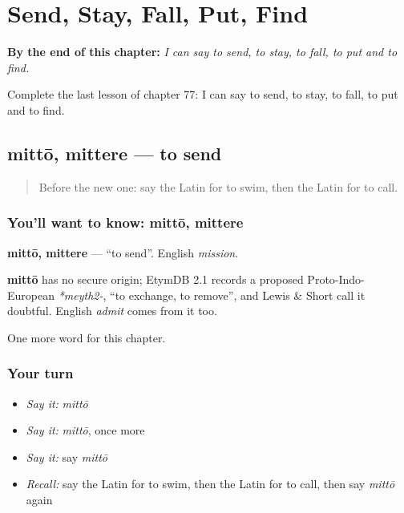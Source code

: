 
\chapter{Send, Stay, Fall, Put, Find}
\label{ch:la-send-stay-fall-put-find}

\begin{chapteropening}
\textbf{By the end of this chapter:} \emph{I can say to send, to stay, to fall, to put and to find.}

Complete the last lesson of chapter 77: I can say to send, to stay, to fall, to put and to find.
\end{chapteropening}

\section[mittō, mittere]{mittō, mittere — to send}

\label{lesson:LA-C77-mitto}



\begin{quote}
Before the new one: say the Latin for to swim, then the Latin for to call.
\end{quote}

\subsection*{You'll want to know: mittō, mittere}
\textbf{mittō, mittere} — \textquotedblleft{}to send\textquotedblright{}. English \emph{mission}.

\begin{cousinweb}
\textbf{mittō} has no secure origin; EtymDB 2.1 records a proposed Proto-Indo-European \emph{*meyth2-}, \textquotedblleft{}to exchange, to remove\textquotedblright{}, and Lewis \& Short call it doubtful. English \emph{admit} comes from it too.
\end{cousinweb}

\begin{grammarlens}[title={What you've built}]
One more word for this chapter.
\end{grammarlens}

\subsection*{Your turn}
\begin{itemize}
\raggedright
  \item \emph{Say it:} \emph{mittō}
  \item \emph{Say it:} \emph{mittō}, once more
  \item \emph{Say it:} say \emph{mittō}
  \item \emph{Recall:} say the Latin for to swim, then the Latin for to call, then say \emph{mittō} again
\end{itemize}

